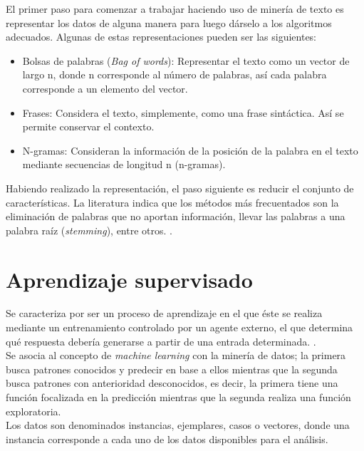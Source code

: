 	El primer paso para comenzar a trabajar haciendo uso de minería de texto es representar los datos de alguna manera para luego dárselo a los algoritmos adecuados. Algunas de estas representaciones pueden ser las siguientes:\\

	\begin{itemize}
	\item Bolsas de palabras (\textit{Bag of words}): Representar el texto como un vector de largo n, donde n corresponde al número de palabras, así cada palabra corresponde a un elemento del vector.
	\item Frases: Considera el texto, simplemente, como una frase sintáctica. Así se permite conservar el contexto.
	\item N-gramas: Consideran la información de la posición de la palabra en el texto mediante secuencias de longitud n (n-gramas). 
	\end{itemize}

	Habiendo realizado la representación, el paso siguiente es reducir el conjunto de características. La literatura indica que los métodos más frecuentados son la eliminación de palabras que no aportan información, llevar las palabras a una palabra raíz (\textit{stemming}), entre otros. \cite{DMPreprocessing}.

\section{Aprendizaje supervisado}
\label{sec:aprendSuperv}

Se caracteriza por ser un proceso de aprendizaje en el que éste se realiza mediante un entrenamiento controlado por un agente externo, el que determina qué respuesta debería generarse a partir de una entrada determinada. \cite{AprendizajeSupervisado}.\\

Se asocia al concepto de \textit{machine learning} con la minería de datos; la primera busca patrones conocidos y predecir en base a ellos mientras que la segunda busca patrones con anterioridad desconocidos, es decir, la primera tiene una función focalizada en la predicción mientras que la segunda realiza una función exploratoria.\\

Los datos son denominados instancias, ejemplares, casos o vectores, donde una instancia corresponde a cada uno de los datos disponibles para el análisis.\\

